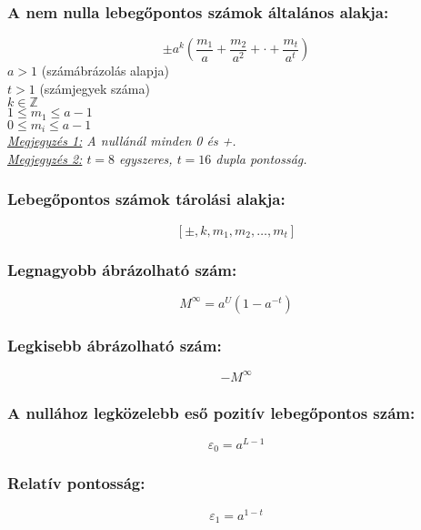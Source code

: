\documentclass[11pt]{article}
\begin{document}
			\subsubsection{A nem nulla lebegőpontos számok általános alakja:}
				\begin{equation}
					\pm a^k\left(\frac{m_1}{a} + \frac{m_2}{a^2} + \cdot + \frac{m_t}{a^t}\right)
				\end{equation}
				$a > 1$ (számábrázolás alapja) \\
				$t > 1$ (számjegyek száma) \\
				$k \in \mathbb{Z}$ \\
				$1 \leq m_1 \leq a - 1$ \\
				$0 \leq m_i \leq a - 1$ \\
				\textit{\underline{Megjegyzés 1:} A nullánál minden 0 és +.} \\
				\textit{\underline{Megjegyzés 2:} $t=8$ egyszeres, $t=16$ dupla pontosság. }
			\subsubsection{Lebegőpontos számok tárolási alakja:}
				\begin{equation}
					\left[\pm, k, m_1, m_2, \dots, m_t\right]
				\end{equation}
			\subsubsection{Legnagyobb ábrázolható szám:}
				\begin{equation}
					M^\infty = a^U(1-a^{-t})
				\end{equation}
			\subsubsection{Legkisebb ábrázolható szám:}
				\begin{equation}
					-M^\infty
				\end{equation}
			\subsubsection{A nullához legközelebb eső pozitív lebegőpontos szám:}
				\begin{equation}
					\varepsilon_0 = a^{L-1}
				\end{equation}
			\subsubsection{Relatív pontosság:}
				\begin{equation}
					\varepsilon_1 = a^{1-t}
				\end{equation}
\end{document}
